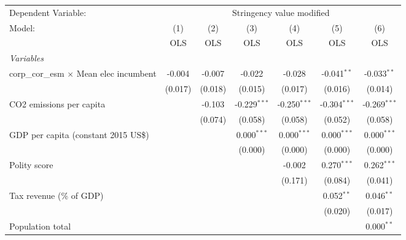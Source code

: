 
\begingroup
\centering
\begin{tabular}{lcccccc}
   \toprule
   Dependent Variable: & \multicolumn{6}{c}{Stringency value modified}\\
   Model:                                         & (1)     & (2)     & (3)            & (4)            & (5)            & (6)\\  
                                                  &  OLS    & OLS     & OLS            & OLS            & OLS            & OLS\\  
   \midrule
   \emph{Variables}\\
   corp\_cor\_esm $\times$ Mean elec incumbent    & -0.004  & -0.007  & -0.022         & -0.028         & -0.041$^{**}$  & -0.033$^{**}$\\   
                                                  & (0.017) & (0.018) & (0.015)        & (0.017)        & (0.016)        & (0.014)\\   
   CO2 emissions per capita                       &         & -0.103  & -0.229$^{***}$ & -0.250$^{***}$ & -0.304$^{***}$ & -0.269$^{***}$\\   
                                                  &         & (0.074) & (0.058)        & (0.058)        & (0.052)        & (0.058)\\   
   GDP per capita (constant 2015 US\$)            &         &         & 0.000$^{***}$  & 0.000$^{***}$  & 0.000$^{***}$  & 0.000$^{***}$\\   
                                                  &         &         & (0.000)        & (0.000)        & (0.000)        & (0.000)\\   
   Polity score                                   &         &         &                & -0.002         & 0.270$^{***}$  & 0.262$^{***}$\\   
                                                  &         &         &                & (0.171)        & (0.084)        & (0.041)\\   
   Tax revenue (\% of GDP)                        &         &         &                &                & 0.052$^{**}$   & 0.046$^{**}$\\   
                                                  &         &         &                &                & (0.020)        & (0.017)\\   
   Population total                               &         &         &                &                &                & 0.000$^{**}$\\   

\end{tabular}
